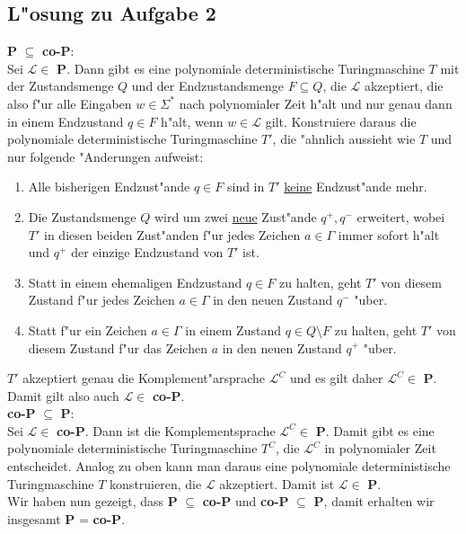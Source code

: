\documentclass[10pt,oneside,onecolumn,a4paper,german,titlepage]{article}
\begin{document}
\subsection*{L"osung zu Aufgabe 2}
\textbf{P} $\subseteq$ \textbf{co-P}:\\
Sei $\mathcal{L} \in$ \textbf{P}. Dann gibt es eine polynomiale deterministische
Turingmaschine $T$ mit der Zustandsmenge $Q$ und der Endzustandsmenge $F \subseteq
Q$, die $\mathcal{L}$ akzeptiert, die also f"ur alle Eingaben $w \in \Sigma^*$ nach
polynomialer Zeit h"alt und nur genau dann in einem Endzustand $q \in F$ h"alt,
wenn $w \in \mathcal{L}$ gilt. Konstruiere daraus die polynomiale deterministische
Turingmaschine $T'$, die "ahnlich aussieht wie $T$ und nur folgende "Anderungen
aufweist:
\begin{enumerate}
\item Alle bisherigen Endzust"ande $q \in F$ sind in $T'$ \underline{keine}
Endzust"ande mehr.
\item Die Zustandsmenge $Q$ wird um zwei \underline{neue} Zust"ande $q^+,q^-$
erweitert, wobei $T'$ in diesen beiden Zust"anden f"ur jedes Zeichen $a \in \Gamma$
immer sofort h"alt und $q^+$ der einzige Endzustand von $T'$ ist.
\item Statt in einem ehemaligen Endzustand $q \in F$ zu halten, geht $T'$ von diesem
Zustand f"ur jedes Zeichen $a \in \Gamma$ in den neuen Zustand $q^-$ "uber.
\item Statt f"ur ein Zeichen $a \in \Gamma$ in einem Zustand $q \in Q \setminus F$
zu halten, geht $T'$ von diesem Zustand f"ur das Zeichen $a$ in den neuen Zustand
$q^+$ "uber.
\end{enumerate}
$T'$ akzeptiert genau die Komplement"arsprache $\mathcal{L}^C$ und es gilt daher
$\mathcal{L}^C \in$ \textbf{P}. Damit gilt also auch $\mathcal{L} \in$ \textbf{co-P}.
\\[4pt]
\textbf{co-P} $\subseteq$ \textbf{P}:\\
Sei $\mathcal{L} \in$ \textbf{co-P}. Dann ist die Komplementsprache $\mathcal{L}^C
\in$ \textbf{P}. Damit gibt es eine polynomiale deterministische Turingmaschine
$T^C$, die $\mathcal{L}^C$ in polynomialer Zeit entscheidet. Analog zu oben kann
man daraus eine polynomiale deterministische Turingmaschine $T$ konstruieren, die
$\mathcal{L}$ akzeptiert. Damit ist $\mathcal{L} \in$ \textbf{P}.
\\[4pt]
Wir haben nun gezeigt, dass \textbf{P} $\subseteq$ \textbf{co-P} und \textbf{co-P}
$\subseteq$ \textbf{P}, damit erhalten wir insgesamt \textbf{P} = \textbf{co-P}.
\end{document}
